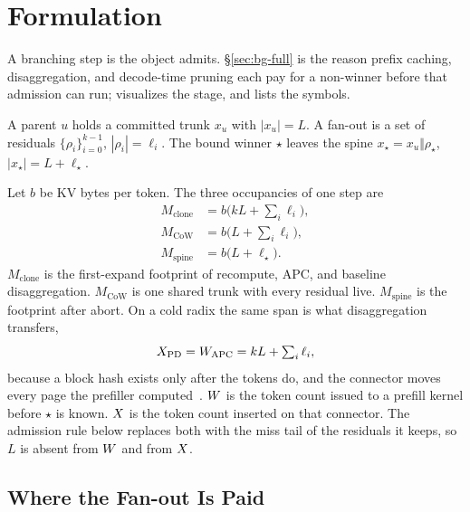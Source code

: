 \section{Formulation}
\label{sec:problem}

A branching step is the object \sys admits.
\S\ref{sec:bg-full} is the reason prefix caching, disaggregation, and decode-time pruning each pay for a non-winner before that admission can run;
 visualizes the stage, and  lists the symbols.

\begin{definition}
\label{def:step}
A parent $u$ holds a committed trunk $x_u$ with $|x_u|{=}L$.
A fan-out is a set of residuals $\{\rho_i\}_{i=0}^{k-1}$, $|\rho_i|{=}\ell_i$.
The bound winner $\star$ leaves the spine $x_\star=x_u\Vert\rho_\star$, $|x_\star|{=}L{+}\ell_\star$.
\end{definition}

Let $b$ be KV bytes per token.
The three occupancies of one step are
\begin{align}
M_{\mathrm{clone}} &= b\bigl(kL+\textstyle\sum_i\ell_i\bigr), \label{eq:mem}\\
M_{\mathrm{CoW}} &= b\bigl(L+\textstyle\sum_i\ell_i\bigr), \nonumber\\
M_{\mathrm{spine}} &= b\bigl(L+\ell_\star\bigr). \nonumber
\end{align}
$M_{\mathrm{clone}}$ is the first-expand footprint of recompute, APC, and baseline disaggregation.
$M_{\mathrm{CoW}}$ is one shared trunk with every residual live.
$M_{\mathrm{spine}}$ is the footprint after abort.
On a cold radix the same span is what disaggregation transfers,
\begin{equation}
\label{eq:xfer-stock}
X_{\mathrm{PD}}=W_{\mathrm{APC}}=kL+\textstyle\sum_i\ell_i,
\end{equation}
because a block hash exists only after the tokens do, and the connector moves every page the prefiller computed~\cite{vllm,distserve,splitwise}.
$W$ is the token count issued to a prefill kernel before $\star$ is known.
$X$ is the token count inserted on that connector.
The admission rule below replaces both with the miss tail of the residuals it keeps, so $L$ is absent from $W$ and from $X$.

\subsection{Where the Fan-out Is Paid}
\label{sec:traditional}

